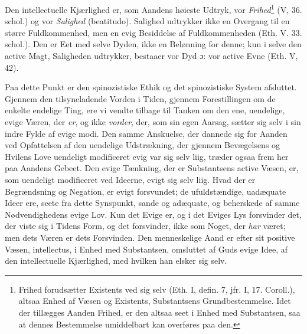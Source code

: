 \documentclass[12pt,a4paper]{book}
\newcommand{\opage}[1]{\marginnote{\footnotesize\textit{[#1]}}}
\begin{document}
Den intellectuelle Kjærlighed er, som Aandens høieste
Udtryk, vor \emph{Frihed}\footnote{Frihed forudsætter Existents ved sig selv (Eth. I, defin. 7, jfr. I,
17. Coroll.), altsaa Enhed af Væsen og Existents, Substantsens
Grundbestemmelse. Idet der tillægges Aanden Frihed, er den altsaa
seet i Enhed med Substantsen, saa at dennes Bestemmelse umiddelbart
kan overføres paa den.} (V, 36. schol.) og vor \emph{Salighed}
(beatitudo). Salighed udtrykker ikke en Overgang til en
større Fuldkommenhed, men en evig Besiddelse af Fuldkommenheden
(Eth. V. 33. schol.). Den er Eet med selve
\opage{170} Dyden, ikke en Belønning for denne; kun i selve den active
Magt, Saligheden udtrykker, bestaaer vor Dyd ɔ: vor active
Evne (Eth. V, 42).

Paa dette Punkt er den spinozistiske Ethik og det spinozistiske
System afsluttet. Gjennem den tilsyneladende
Vorden i Tiden, gjennem Forestillingen om de enkelte endelige
Ting, ere vi vendte tilbage til Tanken om den ene,
uendelige, evige Væren, der \emph{er}, og ikke \emph{vorder}, der, som
sin egen Aarsag, sætter sig selv i sin indre Fylde af evige
modi. Den samme Anskuelse, der dannede sig for Aanden
ved Opfattelsen af den uendelige Udstrækning, der gjennem
Bevægelsens og Hvilens Love uendeligt modificeret evig var
sig selv liig, træder ogsaa frem her paa Aandens Gebeet.
Den evige Tænkning, der er Substantsens active Væsen, er,
som uendeligt modificeret ved Ideerne, evigt sig selv liig.
Hvad der er Begrændsning og Negation, er evigt forsvundet;
de ufuldstændige, uadæquate Ideer ere, seete fra dette Synspunkt,
sande og adæquate, og beherskede af samme Nødvendighedens
evige Lov. Kun det Evige er, og i det Eviges
Lys forsvinder det, der viste sig i Tidens Form, og det
forsvinder, ikke som Noget, der \emph{har} været; men dets Væren
er dets Forsvinden. Den menneskelige Aand er efter sit
positive Væsen, intellectus, i Enhed med Substantsen, omsluttet
af Guds evige Idee, af den intellectuelle Kjærlighed,
med hvilken han elsker sig selv.
\end{document}
